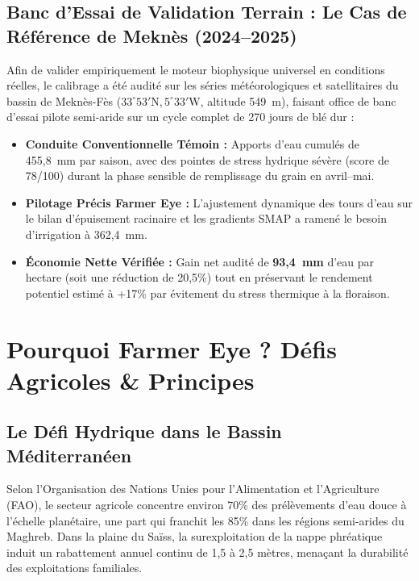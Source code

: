 \documentclass[11pt,a4paper,oneside]{report}
\begin{document}
\section{Banc d'Essai de Validation Terrain : Le Cas de Référence de Meknès (2024–2025)}
Afin de valider empiriquement le moteur biophysique universel en conditions réelles, le calibrage a été audité sur les séries météorologiques et satellitaires du bassin de Meknès-Fès ($33^\circ 53' \text{N}, 5^\circ 33' \text{W}$, altitude 549~m), faisant office de banc d'essai pilote semi-aride sur un cycle complet de 270 jours de blé dur :
\begin{itemize}[leftmargin=*]
    \item \textbf{Conduite Conventionnelle Témoin :} Apports d'eau cumulés de 455,8~mm par saison, avec des pointes de stress hydrique sévère (score de 78/100) durant la phase sensible de remplissage du grain en avril–mai.
    \item \textbf{Pilotage Précis Farmer Eye :} L'ajustement dynamique des tours d'eau sur le bilan d'épuisement racinaire et les gradients SMAP a ramené le besoin d'irrigation à 362,4~mm.
    \item \textbf{Économie Nette Vérifiée :} Gain net audité de \textbf{93,4~mm} d'eau par hectare (soit une réduction de 20,5\%) tout en préservant le rendement potentiel estimé à +17\% par évitement du stress thermique à la floraison.
\end{itemize}

\chapter{Pourquoi Farmer Eye ? Défis Agricoles \& Principes}

\section{Le Défi Hydrique dans le Bassin Méditerranéen}
Selon l'Organisation des Nations Unies pour l'Alimentation et l'Agriculture (FAO), le secteur agricole concentre environ 70\% des prélèvements d'eau douce à l'échelle planétaire, une part qui franchit les 85\% dans les régions semi-arides du Maghreb. Dans la plaine du Saïss, la surexploitation de la nappe phréatique induit un rabattement annuel continu de 1,5 à 2,5 mètres, menaçant la durabilité des exploitations familiales.
\end{document}
